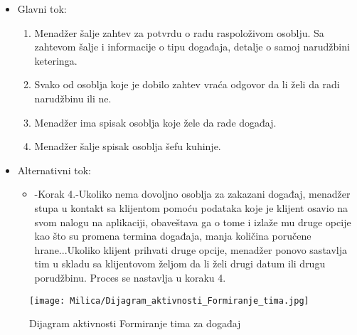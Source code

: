 \documentclass[a4paper]{article}
\begin{document}
      \begin{itemize}
        \item Glavni tok:
          \begin{enumerate}
              \item Menadžer šalje zahtev za potvrdu o radu raspoloživom osoblju. Sa zahtevom šalje i informacije o tipu događaja, detalje o samoj narudžbini keteringa.
        
              \item Svako od osoblja koje je dobilo zahtev vraća odgovor da li želi da radi narudžbinu ili ne.
         
        
              \item Menadžer ima spisak osoblja koje žele da rade događaj.
          
              \item Menadžer šalje spisak osoblja šefu kuhinje.
          \end{enumerate}
    \end{itemize}
      \begin{itemize}
        \item Alternativni tok:
          \begin{itemize}
        \item -Korak 4.-Ukoliko nema dovoljno osoblja za zakazani događaj, menadžer stupa u kontakt sa klijentom pomoću podataka koje je klijent osavio na svom nalogu na aplikaciji, obaveštava ga o tome i izlaže mu druge opcije kao što su promena termina događaja, manja količina poručene hrane...Ukoliko klijent prihvati druge opcije, menadžer ponovo sastavlja tim u skladu sa klijentovom željom da li želi drugi datum ili drugu porudžbinu. Proces se nastavlja u koraku 4.
    \end{itemize}
    \end{itemize}
    
    
\begin{figure}[H]
    \centering
    \texttt{[image: Milica/Dijagram\_aktivnosti\_Formiranje\_tima.jpg]}
    \caption{Dijagram aktivnosti Formiranje tima za događaj }
    \label{fig:FormiranjeTima}
\end{figure}
\end{document}

